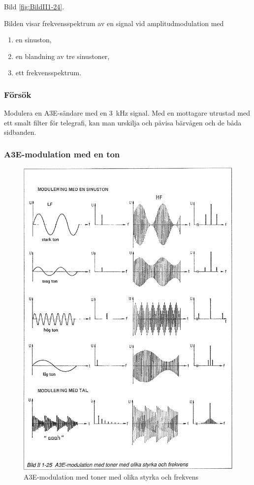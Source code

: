 Bild \ref{fig:BildII1-24}.

Bilden visar frekvensspektrum av en signal vid amplitudmodulation med

\begin{enumerate}[label=\alph*.,noitemsep]
\item en sinuston,
\item en blandning av tre sinustoner,
\item ett frekvensspektrum.
\end{enumerate}

\subsubsection{Försök}

Modulera en A3E-sändare med en 3~kHz signal. Med en mottagare utrustad med ett
smalt filter för telegrafi, kan man urskilja och påvisa bärvågen och de båda
sidbanden.

\subsubsection{A3E-modulation med en ton}

\begin{figure}
\includegraphics[width=\textwidth]{images/bild_2_1-25}
\caption{A3E-modulation med toner med olika styrka och frekvens}
\label{fig:BildII1-25}
\end{figure}

